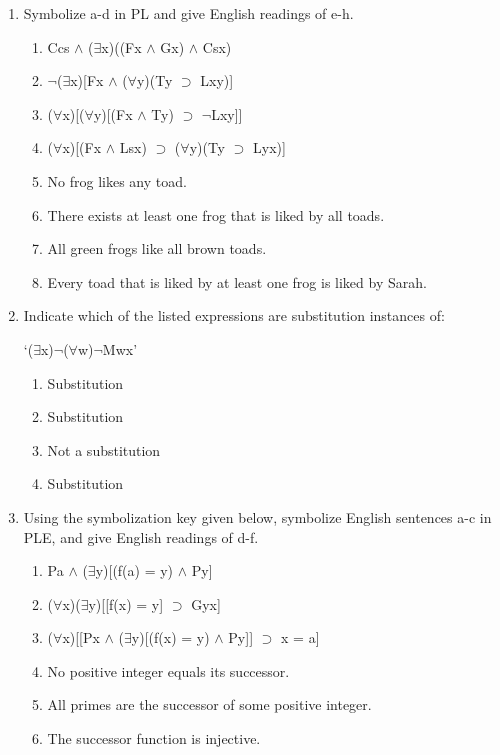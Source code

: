 \documentclass[12pt,letterpaper]{article}
\begin{document}
\begin{enumerate}
    \item
      Symbolize a-d in PL and give English readings of e-h.
      \begin{enumerate}
        \item Ccs $\land$ ($\exists$x)((Fx $\land$ Gx) $\land$ Csx)
        \item $\neg$($\exists$x)[Fx $\land$ ($\forall$y)(Ty $\supset$ Lxy)]
        \item ($\forall$x)[($\forall$y)[(Fx $\land$ Ty) $\supset$ $\neg$Lxy]]
        \item ($\forall$x)[(Fx $\land$ Lsx) $\supset$ ($\forall$y)(Ty $\supset$ Lyx)]

        \item No frog likes any toad.
        \item There exists at least one frog that is liked by all toads.
        \item All green frogs like all brown toads.
        \item Every toad that is liked by at least one frog is liked by Sarah.
      \end{enumerate}

    \item
      Indicate which of the listed expressions are substitution instances of:

      `($\exists$x)$\neg$($\forall$w)$\neg$Mwx'

      \begin{enumerate}
        \item Substitution
        \item Substitution
        \item Not a substitution
        \item Substitution
      \end{enumerate}

    \item
      Using the symbolization key given below,
      symbolize English sentences a-c in PLE,
      and give English readings of d-f.

      \begin{enumerate}
        \item Pa $\land$ ($\exists$y)[(f(a) = y) $\land$ Py]
        \item ($\forall$x)($\exists$y)[[f(x) = y] $\supset$ Gyx]
        \item ($\forall$x)[[Px $\land$ ($\exists$y)[(f(x) = y) $\land$ Py]] $\supset$ x = a]
        \item No positive integer equals its successor.
        \item All primes are the successor of some positive integer.
        \item The successor function is injective.
      \end{enumerate}
  \end{enumerate}
\end{document}
